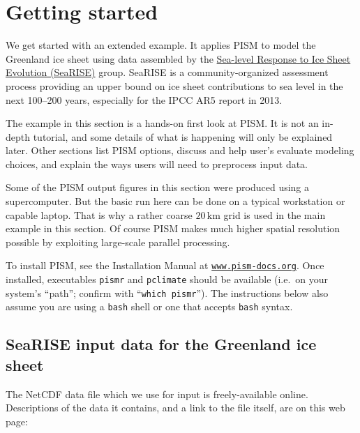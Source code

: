 
\section{Getting started}\label{sec:start}

We get started with an extended example.  It applies PISM to model the Greenland ice sheet using data assembled by the \href{http://websrv.cs.umt.edu/isis/index.php/SeaRISE_Assessment}{Sea-level Response to Ice Sheet Evolution (SeaRISE)} group.  SeaRISE is a community-organized assessment process providing an upper bound on ice sheet contributions to sea level in the next 100--200 years, especially for the IPCC AR5 report in 2013.

The example in this section is a hands-on first look at PISM.  It is not an in-depth tutorial, and some details of what is happening will only be explained later.  Other sections list PISM options, discuss and help user's evaluate modeling choices, and explain the ways users will need to preprocess input data.

Some of the PISM output figures in this section were produced using a supercomputer.  But the basic run here can be done on a typical workstation or capable laptop.  That is why a rather coarse $20\,\textrm{km}$ grid is used in the main example in this section.  Of course PISM makes much higher spatial resolution possible by exploiting large-scale parallel processing.

To install PISM, see the Installation Manual at \href{http://www.pism-docs.org}{\texttt{www.pism-docs.org}}.
Once installed, executables \texttt{pismr} and \texttt{pclimate} should be available (i.e.~on your system's ``path''; confirm with ``\texttt{which pismr}'').  The instructions below also assume you are using a \texttt{bash} shell or one that accepts \texttt{bash} syntax.


\subsection{SeaRISE input data for the Greenland ice sheet}

The NetCDF data file which we use for input is freely-available online.  Descriptions of the data it contains, and a link to the file itself, are on this web page: 
\medskip

\centerline{}
\medskip

